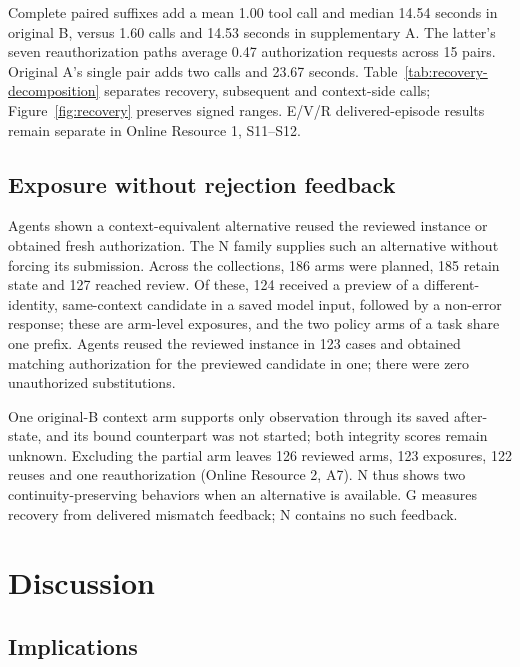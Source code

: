 

Complete paired suffixes add a mean 1.00 tool call and median 14.54 seconds in original B, versus 1.60 calls and 14.53 seconds in supplementary A. The latter's seven reauthorization paths average 0.47 authorization requests across 15 pairs. Original A's single pair adds two calls and 23.67 seconds. Table~\ref{tab:recovery-decomposition} separates recovery, subsequent and context-side calls; Figure~\ref{fig:recovery} preserves signed ranges. E/V/R delivered-episode results remain separate in Online Resource 1, S11--S12.

\subsection{Exposure without rejection feedback}\label{opportunity-and-voluntary-behavior}

Agents shown a context-equivalent alternative reused the reviewed instance or obtained fresh authorization. The N family supplies such an alternative without forcing its submission. Across the collections, 186 arms were planned, 185 retain state and 127 reached review. Of these, 124 received a preview of a different-identity, same-context candidate in a saved model input, followed by a non-error response; these are arm-level exposures, and the two policy arms of a task share one prefix. Agents reused the reviewed instance in 123 cases and obtained matching authorization for the previewed candidate in one; there were zero unauthorized substitutions.

One original-B context arm supports only observation through its saved after-state, and its bound counterpart was not started; both integrity scores remain unknown. Excluding the partial arm leaves 126 reviewed arms, 123 exposures, 122 reuses and one reauthorization (Online Resource 2, A7). N thus shows two continuity-preserving behaviors when an alternative is available. G measures recovery from delivered mismatch feedback; N contains no such feedback.

\section{Discussion}\label{discussion}

\subsection{Implications}\label{design-implications}

